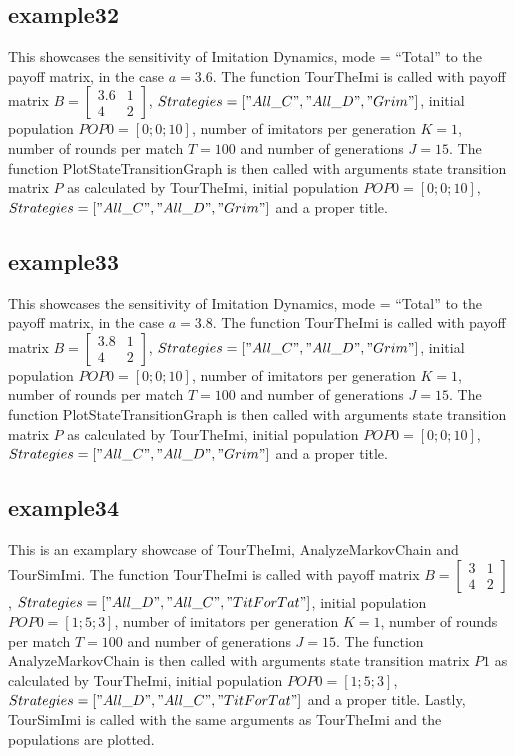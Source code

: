 \subsection{example32}
This showcases the sensitivity of Imitation Dynamics, mode = ``Total'' to the payoff matrix, in the case $a = 3.6$. The function TourTheImi is called with payoff matrix $B = \begin{bmatrix} 3.6 & 1 \\ 4 & 2 \end{bmatrix}$, $Strategies = ["All\_C", "All\_D", "Grim"]$, initial population $POP0 = [0; 0; 10]$, number of imitators per generation $K=1$, number of rounds per match $T = 100$ and number of generations $J = 15$. The function PlotStateTransitionGraph is then called with arguments state transition matrix $P$ as calculated by TourTheImi, initial population $POP0 = [0; 0; 10]$, $Strategies = ["All\_C", "All\_D", "Grim"]$ and a proper title.

\subsection{example33}
This showcases the sensitivity of Imitation Dynamics, mode = ``Total'' to the payoff matrix, in the case $a = 3.8$. The function TourTheImi is called with payoff matrix $B = \begin{bmatrix} 3.8 & 1 \\ 4 & 2 \end{bmatrix}$, $Strategies = ["All\_C", "All\_D", "Grim"]$, initial population $POP0 = [0; 0; 10]$, number of imitators per generation $K=1$, number of rounds per match $T = 100$ and number of generations $J = 15$. The function PlotStateTransitionGraph is then called with arguments state transition matrix $P$ as calculated by TourTheImi, initial population $POP0 = [0; 0; 10]$, $Strategies = ["All\_C", "All\_D", "Grim"]$ and a proper title.

\subsection{example34}
This is an examplary showcase of TourTheImi, AnalyzeMarkovChain and TourSimImi. The function TourTheImi is called with payoff matrix $B = \begin{bmatrix} 3 & 1 \\ 4 & 2 \end{bmatrix}$, $Strategies = ["All\_D", "All\_C", "TitForTat"]$, initial population $POP0 = [1; 5; 3]$, number of imitators per generation $K=1$, number of rounds per match $T = 100$ and number of generations $J = 15$. The function AnalyzeMarkovChain is then called with arguments state transition matrix $P1$ as calculated by TourTheImi, initial population $POP0 = [1; 5; 3]$, $Strategies = ["All\_D", "All\_C", "TitForTat"]$ and a proper title. Lastly, TourSimImi is called with the same arguments as TourTheImi and the populations are plotted.

